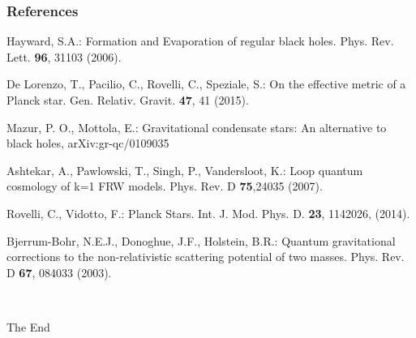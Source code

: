\documentclass{beamer}
\begin{document}
\begin{frame}
\frametitle{References}
\footnotesize{
\begin{thebibliography}{99} %

 Hayward, S.A.: Formation and Evaporation of regular black holes. Phys. Rev. Lett. \textbf{96}, 31103 (2006).

 De Lorenzo, T., Pacilio, C., Rovelli, C., Speziale, S.: On the effective metric of a Planck star. Gen. Relativ. Gravit. \textbf{47}, 41 (2015).

 Mazur, P. O., Mottola, E.: Gravitational condensate stars: An alternative to black holes, arXiv:gr-qc/0109035 

 Ashtekar, A., Pawlowski, T., Singh, P., Vandersloot, K.: Loop quantum cosmology of k=1 FRW models. Phys. Rev. D \textbf{75},24035 (2007).

 Rovelli, C., Vidotto, F.: Planck Stars. Int. J. Mod. Phys. D. \textbf{23}, 1142026, (2014).

 Bjerrum-Bohr, N.E.J., Donoghue, J.F., Holstein, B.R.: Quantum gravitational corrections to the non-relativistic scattering potential of two masses. Phys. Rev. D \textbf{67}, 084033 (2003). 



\end{thebibliography}
}
\
\end{frame}



\begin{frame}
\Huge{\centerline{The End}}
\end{frame}

\end{document}
